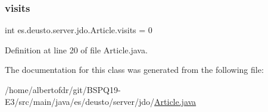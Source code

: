\subsubsection{\texorpdfstring{visits}{visits}}
{\footnotesize\ttfamily int es.\+deusto.\+server.\+jdo.\+Article.\+visits = 0}



Definition at line 20 of file Article.\+java.



The documentation for this class was generated from the following file\+:\begin{DoxyCompactItemize}
\item 
/home/albertofdr/git/\+B\+S\+P\+Q19-\/\+E3/src/main/java/es/deusto/server/jdo/\hyperlink{_article_8java}{Article.\+java}\end{DoxyCompactItemize}
